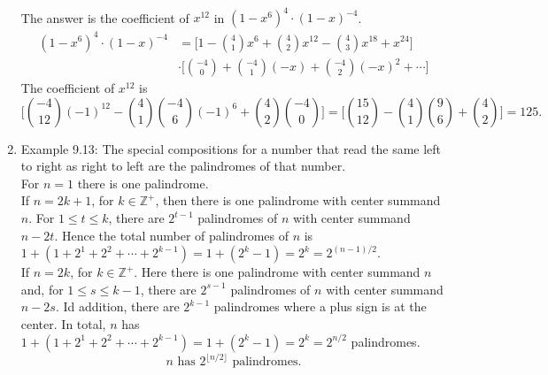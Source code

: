 \documentclass[a4paper]{article}
\begin{document}
\begin{enumerate}
\begin{align*}
    \end{align*}
    The answer is the coefficient of $x^{12}$ in $(1-x^6)^4\cdot (1-x)^{-4}$.
    \begin{align*}
        (1-x^6)^4\cdot (1-x)^{-4}&=\Bigg[1-\binom{4}{1}x^6+\binom{4}{2}x^{12}-\binom{4}{3}x^{18}+x^{24}\Bigg]\\
        &\cdot\Bigg[\binom{-4}{0}+\binom{-4}{1}(-x)+\binom{-4}{2}(-x)^2+\cdots\Bigg]
    \end{align*}
    The coefficient of $x^{12}$ is
    $$
    \Bigg[\binom{-4}{12}(-1)^{12}-\binom{4}{1}\binom{-4}{6}(-1)^6+\binom{4}{2}\binom{-4}{0}\Bigg]=\Bigg[\binom{15}{12}-\binom{4}{1}\binom{9}{6}+\binom{4}{2}\Bigg]=125.
    $$
    \item Example 9.13: The special compositions for a number that read the same left to right as right to left are the palindromes of that number.\\
    For $n=1$ there is one palindrome.\\
    If $n=2k+1$, for $k\in\mathbb{Z}^+$, then there is one palindrome with center summand $n$. For $1\leq t\leq k$, there are $2^{t-1}$ palindromes of $n$ with center summand $n-2t$. Hence the total number of palindromes of $n$ is $1+(1+2^1+2^2+\cdots+2^{k-1})=1+(2^k-1)=2^k=2^{(n-1)/2}$.\\
    If $n=2k$, for $k\in\mathbb{Z}^+$. Here there is one palindrome with center summand $n$ and, for $1\leq s\leq k-1$, there are $2^{s-1}$ palindromes of $n$ with center summand $n-2s$. Id addition, there are $2^{k-1}$ palindromes where a plus sign is at the center. In total, $n$ has $1+(1+2^1+2^2+\cdots+2^{k-1})=1+(2^k-1)=2^k=2^{n/2}$ palindromes.
    $$
    n \text{ has } 2^{\lfloor n/2\rfloor} \text{ palindromes.}
    $$
\end{enumerate}
\end{document}
